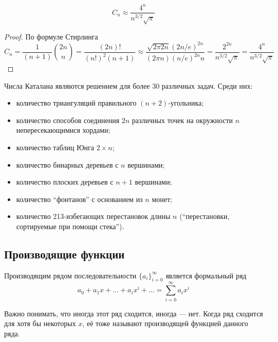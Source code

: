 \documentclass[12pt,a4paper]{article}
\begin{document}
    \begin{statement}
        \[C_n \approx \frac{4^n}{n^{3/2}\sqrt{\pi}}\]
    \end{statement}

    \begin{proof}
        По формуле Стирлинга
        \[
            C_n = \frac{1}{(n+1)}\binom{2n}{n} = \frac{(2n)!}{(n!)^2(n+1)} \approx \frac{\sqrt{2\pi 2n}(2n/e)^{2n}}{(2\pi n)(n/e)^{2n}n} = \frac{2^{2n}}{n^{3/2}\sqrt{\pi}} = \frac{4^n}{n^{3/2}\sqrt{\pi}}
        \]
    \end{proof}

    \begin{remark}
        Числа Каталана являются решением для более 30 различных задач. Среди них:
        \begin{itemize}
            \item количество триангуляций правильного $(n+2)$-угольника;
            \item количество способов соединения $2n$ различных точек на окружности $n$ непересекающимися хордами;
            \item количество таблиц Юнга $2 \times n$;
            \item количество бинарных деревьев с $n$ вершинами;
            \item количество плоских деревьев с $n+1$ вершинами;
            \item количество ``фонтанов'' с основанием из $n$ монет;
            \item количество 213-избегающих перестановок длины $n$ (``перестановки, сортируемые при помощи стека'').
        \end{itemize}
    \end{remark}

    \subsection{Производящие функции}

    \begin{definition}
        Производящим рядом последовательности $\{a_i\}_{i=0}^\infty$ является формальный ряд
        \[a_0 + a_1 x + \dots + a_i x^i + \dots = \sum_{i=0}^\infty a_i x^i\]

        Важно понимать, что иногда этот ряд сходится, иногда --- нет. Когда ряд сходится для хотя бы некоторых $x$, её тоже называют производящей функцией данного ряда.
    \end{definition}
\end{document}
